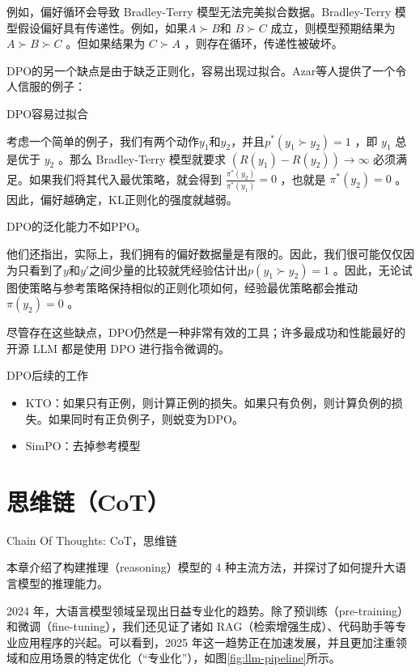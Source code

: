 \documentclass[lang=cn,newtx,10pt,scheme=chinese]{elegantbook}
\begin{document}
\begin{marker}
例如，偏好循环会导致 Bradley-Terry 模型无法完美拟合数据。Bradley-Terry 模型假设偏好具有传递性。例如，如果$A \succ B$和 $B \succ C$ 成立，则模型预期结果为 $A \succ B \succ C$ 。但如果结果为 $C \succ A$ ，则存在循环，传递性被破坏。
\end{marker}

DPO的另一个缺点是由于缺乏正则化，容易出现过拟合。Azar等人提供了一个令人信服的例子：

\begin{marker}
DPO容易过拟合

考虑一个简单的例子，我们有两个动作$y_1$和$y_2$，并且$p^*(y_1\succ y_2)=1$ ，即 $y_1$ 总是优于 $y_2$ 。那么 Bradley-Terry 模型就要求 $(R(y_1)-R(y_2))\rightarrow\infty$ 必须满足。如果我们将其代入最优策略，就会得到 $\frac{\pi^*(y_2)}{\pi^*(y_1)}=0$ ，也就是 $\pi^*(y_2)=0$ 。 因此，偏好越确定，KL正则化的强度就越弱。

DPO的泛化能力不如PPO。
\end{marker}

他们还指出，实际上，我们拥有的偏好数据量是有限的。因此，我们很可能仅仅因为只看到了$y$和$y'$之间少量的比较就凭经验估计出$p(y_1\succ y_2)=1$ 。因此，无论试图使策略与参考策略保持相似的正则化项如何，经验最优策略都会推动$\pi(y_2)=0$ 。

尽管存在这些缺点，DPO仍然是一种非常有效的工具；许多最成功和性能最好的开源 LLM 都是使用 DPO 进行指令微调的。

\begin{marker}
DPO后续的工作
\begin{itemize}
\item KTO：如果只有正例，则计算正例的损失。如果只有负例，则计算负例的损失。如果同时有正负例子，则蜕变为DPO。
\item SimPO：去掉参考模型
\end{itemize}
\end{marker}

\section{思维链（CoT）}


\begin{marker}
Chain Of Thoughts: CoT，思维链
\end{marker}

本章介绍了构建推理（reasoning）模型的 4 种主流方法，并探讨了如何提升大语言模型的推理能力。

2024 年，大语言模型领域呈现出日益专业化的趋势。除了预训练（pre-training）和微调（fine-tuning），我们还见证了诸如 RAG（检索增强生成）、代码助手等专业应用程序的兴起。可以看到，2025 年这一趋势正在加速发展，并且更加注重领域和应用场景的特定优化（``专业化''），如图\ref{fig:llm-pipeline}所示。
\end{document}

